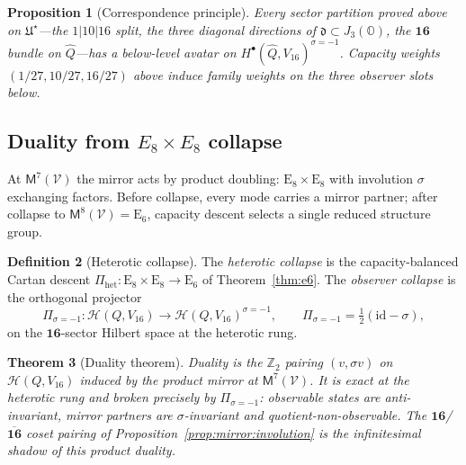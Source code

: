 \documentclass[11pt]{article}
\theoremstyle{plain}
\newtheorem{theorem}{Theorem}[section]
\newtheorem{proposition}[theorem]{Proposition}
\theoremstyle{definition}
\newtheorem{definition}[theorem]{Definition}
\theoremstyle{remark}
\numberwithin{equation}{section}
\newcommand{\jalg}{J_3(\mathbb{O})}
\newcommand{\E}[1]{\mathrm{E}_{#1}}
\newcommand{\Void}{\mathcal{V}}
\newcommand{\Mirror}{\mathsf{M}}
\begin{document}
\begin{proposition}[Correspondence principle]\label{prop:above-below}
Every sector partition proved above on $\mathfrak{U}^\star$---the $1|10|16$
split, the three diagonal directions of $\mathfrak{d}\subset\jalg$, the
$\mathbf{16}$ bundle on $\hat Q$---has a below-level avatar on
$H^\bullet(\hat Q,V_{16})^{\sigma=-1}$. Capacity weights
$(1/27,10/27,16/27)$ above induce family weights on the three observer slots
below.
\end{proposition}

\subsection{Duality from $E_8\times E_8$ collapse}
\label{sec:observer:duality}

At $\Mirror^7(\Void)$ the mirror acts by product doubling:
$\E{8}\times\E{8}$ with involution $\sigma$ exchanging factors. Before
collapse, every mode carries a mirror partner; after collapse to
$\Mirror^8(\Void)=\E{6}$, capacity descent selects a single reduced structure
group.

\begin{definition}[Heterotic collapse]\label{def:heterotic-collapse}
The \emph{heterotic collapse} is the capacity-balanced Cartan descent
$\Pi_{\mathrm{het}}:\E{8}\times\E{8}\to\E{6}$ of Theorem~\ref{thm:e6}.
The \emph{observer collapse} is the orthogonal projector
\begin{equation}\label{eq:collapse-observer}
  \Pi_{\sigma=-1}: \mathcal{H}(Q,V_{16}) \to \mathcal{H}(Q,V_{16})^{\sigma=-1},
  \qquad
  \Pi_{\sigma=-1}=\tfrac12(\mathrm{id}-\sigma),
\end{equation}
on the $\mathbf{16}$-sector Hilbert space at the heterotic rung.
\end{definition}

\begin{theorem}[Duality theorem]\label{thm:duality}
Duality is the $\mathbb{Z}_2$ pairing $(v,\sigma v)$ on
$\mathcal{H}(Q,V_{16})$ induced by the product mirror at
$\Mirror^7(\Void)$. It is exact at the heterotic rung and broken precisely by
$\Pi_{\sigma=-1}$: observable states are anti-invariant, mirror partners are
$\sigma$-invariant and quotient-non-observable. The $\mathbf{16}$/
$\overline{\mathbf{16}}$ coset pairing of Proposition~\ref{prop:mirror:involution}
is the infinitesimal shadow of this product duality.
\end{theorem}
\end{document}
